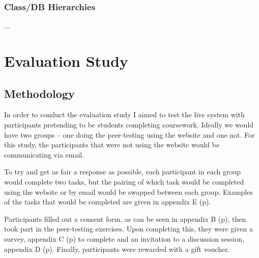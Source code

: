 \documentclass[a4paper,11pt]{report}
\begin{document}
\subsection{Class/DB Hierarchies}
\doublespacing
...

\chapter{Evaluation Study}
\section{Methodology}
In order to conduct the evaluation study I aimed to test the live system with participants pretending to be students completing coursework. Ideally we would have two groups -- one doing the peer-testing using the website and one not. For this study, the participants that were not using the website would be communicating via email.\par
To try and get as fair a response as possible, each participant in each group would complete two tasks, but the pairing of which task would be completed using the website or by email would be swapped between each group. Examples of the tasks that would be completed are given in appendix E (p\pageref{app:descriptors}).\par
Participants filled out a consent form, as can be seen in appendix B (p\pageref{app:consent}), then took part in the peer-testing exercises. Upon completing this, they were given a survey, appendix C (p\pageref{app:survey}) to complete and an invitation to a discussion session, appendix D (p\pageref{app:discussion}). Finally, participants were rewarded with a gift voucher.
\end{document}
